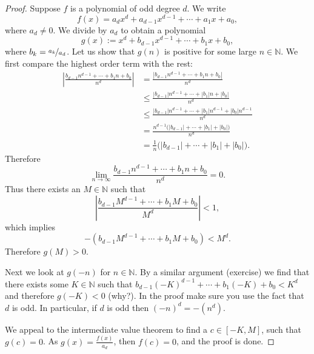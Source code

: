 \documentclass[12pt]{book}
\newcommand{\abs}[1]{\left\lvert {#1} \right\rvert}
\newcommand{\N}{{\mathbb{N}}}
\theoremstyle{plain}
\theoremstyle{remark}
\theoremstyle{definition}
\theoremstyle{exercise}
\theoremstyle{example}
\begin{document}
\begin{proof}
Suppose $f$ is a polynomial of odd degree $d$.  We write
\begin{equation*}
f(x) = a_d x^d + a_{d-1} x^{d-1} + \cdots + a_1 x + a_0 ,
\end{equation*}
where $a_d \not= 0$.  We divide by $a_d$ to obtain a polynomial
\begin{equation*}
g(x) := x^d + b_{d-1} x^{d-1} + \cdots + b_1 x + b_0 ,
\end{equation*}
where $b_k = \nicefrac{a_k}{a_d}$.
Let us show that $g(n)$ is
positive for some large $n \in \N$.
We first compare the highest order term with the rest:
\begin{equation*}
\begin{split}
\abs{\frac{b_{d-1} n^{d-1} + \cdots + b_1 n + b_0}{n^d}}
& =
\frac{\abs{b_{d-1} n^{d-1} + \cdots + b_1 n + b_0}}{n^d}
\\
& \leq
\frac{\abs{b_{d-1}} n^{d-1} + \cdots + \abs{b_1} n + \abs{b_0}}{n^d}
\\
& \leq
\frac{\abs{b_{d-1}} n^{d-1} + \cdots + \abs{b_1} n^{d-1} + \abs{b_0} n^{d-1}}{n^d}
\\
& =
\frac{n^{d-1}\bigl(\abs{b_{d-1}} + \cdots + \abs{b_1} + \abs{b_0}\bigr)}{n^d}
\\
& =
\frac{1}{n}
\bigl(\abs{b_{d-1}} + \cdots + \abs{b_1} + \abs{b_0}\bigr) .
\end{split}
\end{equation*}
Therefore
\begin{equation*}
\lim_{n\to\infty} \frac{b_{d-1} n^{d-1} + \cdots + b_1 n + b_0}{n^d}
= 0 .
\end{equation*}
Thus there exists an $M \in \N$ such that 
\begin{equation*}
\abs{\frac{b_{d-1} M^{d-1} + \cdots + b_1 M + b_0}{M^d}} < 1 ,
\end{equation*}
which implies
\begin{equation*}
-(b_{d-1} M^{d-1} + \cdots + b_1 M + b_0) < M^d .
\end{equation*}
Therefore $g(M) > 0$.

Next we look at $g(-n)$ for $n \in \N$.  By a similar argument (exercise)
we find that there exists some $K \in \N$ such that
$b_{d-1} {(-K)}^{d-1} + \cdots + b_1 (-K) + b_0 < K^d$
and therefore $g(-K) < 0$ (why?).
In the
proof make sure you use the fact that $d$ is odd.  In particular, 
if $d$ is odd then ${(-n)}^d = -(n^d)$.

We appeal to the intermediate value theorem to find a
$c \in [-K,M]$, such that $g(c) = 0$.  As $g(x) = \frac{f(x)}{a_d}$,
then $f(c) = 0$, and the proof is done.
\end{proof}
\end{document}
